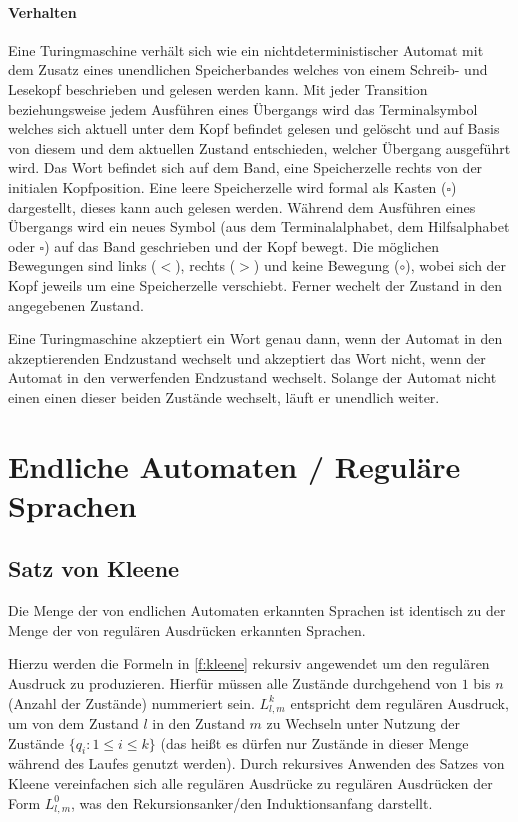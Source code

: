 \documentclass[a4paper, 11pt, accentcolor = tud3b]{tudreport}
\begin{document}
            \paragraph{Verhalten}
                Eine Turingmaschine verhält sich wie ein nichtdeterministischer Automat mit dem Zusatz eines unendlichen Speicherbandes welches von einem Schreib- und Lesekopf beschrieben und gelesen werden kann. Mit jeder Transition beziehungsweise jedem Ausführen eines Übergangs wird das Terminalsymbol welches sich aktuell unter dem Kopf befindet gelesen und gelöscht und auf Basis von diesem und dem aktuellen Zustand entschieden, welcher Übergang ausgeführt wird. Das Wort befindet sich auf dem Band, eine Speicherzelle rechts von der initialen Kopfposition. Eine leere Speicherzelle wird formal als Kasten ($ \square $) dargestellt, dieses kann auch gelesen werden. Während dem Ausführen eines Übergangs wird ein neues Symbol (aus dem Terminalalphabet, dem Hilfsalphabet oder $ \square $) auf das Band geschrieben und der Kopf bewegt. Die möglichen Bewegungen sind links ($ < $), rechts ($ > $) und keine Bewegung ($ \circ $), wobei sich der Kopf jeweils um eine Speicherzelle verschiebt. Ferner wechelt der Zustand in den angegebenen Zustand.

                Eine Turingmaschine akzeptiert ein Wort genau dann, wenn der Automat in den akzeptierenden Endzustand wechselt und akzeptiert das Wort nicht, wenn der Automat in den verwerfenden Endzustand wechselt. Solange der Automat nicht einen einen dieser beiden Zustände wechselt, läuft er unendlich weiter.


    \section{Endliche Automaten / Reguläre Sprachen}
        \subsection{Satz von Kleene}
            Die Menge der von endlichen Automaten erkannten Sprachen ist identisch zu der Menge der von regulären Ausdrücken erkannten Sprachen.

            Hierzu werden die Formeln in \ref{f:kleene} rekursiv angewendet um den regulären Ausdruck zu produzieren. Hierfür müssen alle Zustände durchgehend von $ 1 $ bis $ n $ (Anzahl der Zustände) nummeriert sein. $ L ^ k _ { l, m } $ entspricht dem regulären Ausdruck, um von dem Zustand $ l $ in den Zustand $ m $ zu Wechseln unter Nutzung der Zustände $ \{ q _ i : 1 \leq i \leq k \} $ (das heißt es dürfen nur Zustände in dieser Menge während des Laufes genutzt werden). Durch rekursives Anwenden des Satzes von Kleene vereinfachen sich alle regulären Ausdrücke zu regulären Ausdrücken der Form $ L ^ 0 _ { l, m } $, was den Rekursionsanker/den Induktionsanfang darstellt.
\end{document}

